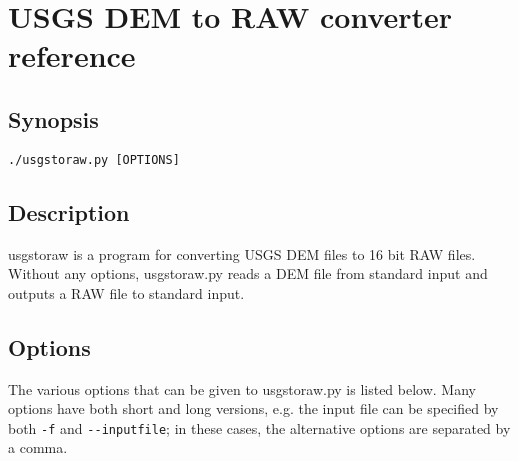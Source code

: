 \chapter{USGS DEM to RAW converter reference}

\section*{Synopsis}
\texttt{./usgstoraw.py [OPTIONS]}

\section*{Description}
usgstoraw is a program for converting USGS DEM files to 16 bit RAW files. Without any options, usgstoraw.py reads a DEM file from standard input and outputs a RAW file to standard input. 

\section*{Options}
The various options that can be given to usgstoraw.py is listed below. Many options have both short and long versions, e.g. the input file can be specified by both \texttt{-f} and \texttt{-{-}inputfile}; in these cases, the alternative options are separated by a comma.

